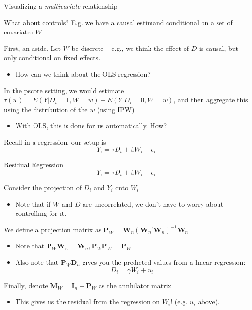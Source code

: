 \documentclass[notes,11pt, aspectratio=169]{beamer}
\newcommand\1{\operatorname{\mathbbm{1}}\indicatorfence}
\newenvironment{wideitemize}{\itemize\addtolength{\itemsep}{10pt}}{\enditemize}
\begin{document}
\begin{frame}{Visualizing a \emph{multivariate} relationship}
  \begin{wideitemize}
  \item What about controls? E.g. we have a causal estimand conditional on a set of covariates $W$
  \item First, an aside. Let $W$ be discrete -- e.g., we think the
    effect of $D$ is causal, but only conditional on fixed effects.
    \begin{itemize}
    \item How can we think about the OLS regression?
    \end{itemize}
  \item In the pscore setting, we would estimate
    $\tau(w) = E(Y|D_{i}=1, W=w) - E(Y | D_{i} = 0, W = w)$, and then
    aggregate this using the distribution of the $w$ (using IPW)
    \begin{itemize}
    \item With OLS, this is done for us automatically. How?
    \end{itemize}
  \item Recall in a regression, our setup is
    $$ Y_{i} = \tau D_{i} + \beta W_{i} + \epsilon_{i}$$
  \end{wideitemize}
\end{frame}

\begin{frame}{Residual Regression}
    $$ Y_{i} = \tau D_{i} + \beta W_{i} + \epsilon_{i}$$
  \begin{wideitemize}
  \item Consider the projection of $D_{i}$ and $Y_{i}$ onto $W_{i}$ 
    \begin{itemize}
      \item Note that if $W$ and $D$ are uncorrelated, we don't have to worry about controlling for it.
      \end{itemize}
    \item We define a projection matrix as $\mathbf{P}_{W} = \mathbf{W}_{n}(\mathbf{W}_{n}'\mathbf{W}_{n})^{-1}\mathbf{W}_{n}$
      \begin{itemize}
      \item Note that $\mathbf{P}_{W}\mathbf{W}_{n} = \mathbf{W}_{n}, \mathbf{P}_{W}\mathbf{P}_{W} = \mathbf{P}_{W}$
      \item Also note that $\mathbf{P}_{W}\mathbf{D}_{n}$ gives you
        the predicted values from a linear regression:
        $$D_{i} = \gamma W_{i} + u_{i}$$
      \end{itemize}
    \item Finally, denote $\mathbf{M}_{W} = \mathbf{I}_{n} - \mathbf{P}_{W}$ as the annhilator matrix
      \begin{itemize}
      \item This gives us the residual from the regression on $W_{i}$! (e.g. $u_{i}$ above).
      \end{itemize}
  \end{wideitemize}
\end{frame}
\end{document}
